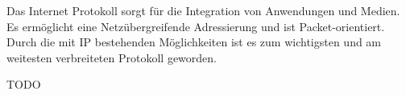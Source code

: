 \begin{answer}
Das Internet Protokoll sorgt für die Integration von Anwendungen und Medien. Es ermöglicht
eine Netzübergreifende Adressierung und ist Packet-orientiert.
Durch die mit IP bestehenden Möglichkeiten ist es zum wichtigsten und am weitesten verbreiteten Protokoll geworden.
\end{answer}

\begin{answer}
TODO
\end{answer}